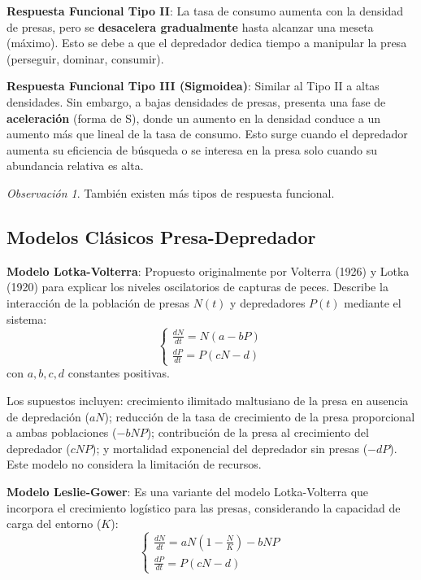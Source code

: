 \documentclass[12pt,letterpaper,oneside]{book}
\theoremstyle{definition}
\theoremstyle{remark}
\newtheorem{observacion}[teorema]{Observación}
\begin{document}
	\textbf{Respuesta Funcional Tipo II}:
		La tasa de consumo aumenta con la densidad de presas, pero se \textbf{desacelera gradualmente} hasta alcanzar una meseta (máximo). Esto se debe a que el depredador dedica tiempo a manipular la presa (perseguir, dominar, consumir).
	
	\textbf{Respuesta Funcional Tipo III (Sigmoidea)}:
		Similar al Tipo II a altas densidades. Sin embargo, a bajas densidades de presas, presenta una fase de \textbf{aceleración} (forma de S), donde un aumento en la densidad conduce a un aumento más que lineal de la tasa de consumo. Esto surge cuando el depredador aumenta su eficiencia de búsqueda o se interesa en la presa solo cuando su abundancia relativa es alta.
	
	\begin{observacion}
		También existen más tipos de respuesta funcional.
	\end{observacion}
	
	\subsection{Modelos Clásicos Presa-Depredador}
	
	\textbf{Modelo Lotka-Volterra}:
		Propuesto originalmente por Volterra (1926) y Lotka (1920) para explicar los niveles oscilatorios de capturas de peces. Describe la interacción de la población de presas $N(t)$ y depredadores $P(t)$ mediante el sistema:
		\begin{equation}
			\begin{cases} 
				\frac{dN}{dt} = N(a - bP) \\
				\frac{dP}{dt} = P(cN - d)
			\end{cases}
		\end{equation}
		con $a, b, c, d$ constantes positivas.
		
		Los supuestos incluyen: crecimiento ilimitado maltusiano de la presa en ausencia de depredación ($aN$); reducción de la tasa de crecimiento de la presa proporcional a ambas poblaciones ($-bNP$); contribución de la presa al crecimiento del depredador ($cNP$); y mortalidad exponencial del depredador sin presas ($-dP$). Este modelo no considera la limitación de recursos.
	
	\textbf{Modelo Leslie-Gower}:
		Es una variante del modelo Lotka-Volterra que incorpora el crecimiento logístico para las presas, considerando la capacidad de carga del entorno ($K$):
		\begin{equation}
			\begin{cases} 
				\frac{dN}{dt} = aN\left(1 - \frac{N}{K}\right) - bNP \\
				\frac{dP}{dt} = P(cN - d)
			\end{cases}
		\end{equation}
		
\end{document}
